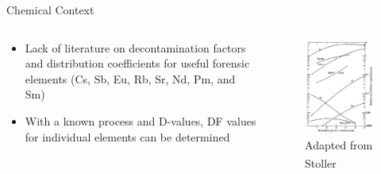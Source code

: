 \documentclass{beamer}
\newcommand{\tss}{\textsuperscript}
\begin{document}
\begin{frame}{Chemical Context}
  \begin{columns}
    \begin{column}{0.5\textwidth}
      \vspace{-10mm}
      \begin{itemize}
      \item{Lack of literature on decontamination factors and
        distribution coefficients for useful forensic elements (Cs, Sb,
        Eu, Rb, Sr, Nd, Pm, and Sm)}
      \item{With a known process and D-values, DF values for individual elements can
        be determined}
      \end{itemize}
    \end{column}
    \begin{column}{0.5\textwidth}
      \begin{figure}[H]
        \vspace*{-1cm}
        \begin{center}
          \includegraphics[scale = 0.5]{figures/Stoller}
          \vspace{-0.5cm}
           \caption{\tiny{Adapted from Stoller\tss{\cite{stoller1961reactor}}}}
        \end{center}
      \end{figure}

\end{column}
\end{columns}
\end{frame}
\end{document}
